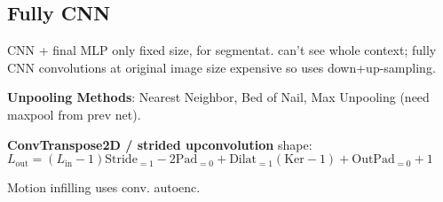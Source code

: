 \subsection*{Fully CNN}

CNN + final MLP only fixed size, for segmentat. can't see whole context; fully CNN convolutions at original image size expensive so uses down+up-sampling.

\textbf{Unpooling Methods}: Nearest Neighbor, Bed of Nail, Max Unpooling (need maxpool from prev net).

\textbf{ConvTranspose2D / strided upconvolution} shape: \(L_{\text{out}} = (L_{\text{in}} - 1)\text{Stride}_{=1} - 2  \text{Pad}_{=0} + \text{Dilat}_{=1}(\text{Ker} - 1) + \text{OutPad}_{=0} + 1\)

Motion infilling uses conv. autoenc.